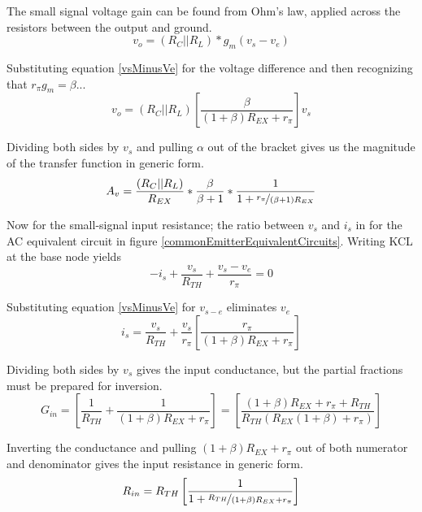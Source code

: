 \documentclass[titlepage, letterpaper, 11pt]{article}
\begin{document}
The small signal voltage gain can be found from Ohm's law, applied
across the resistors between the output and ground.
\begin{equation*}
v_{o}=(R_{C}||R_{L})*g_{m}(v_{s}-v_{e})
\end{equation*}

Substituting equation \ref{vsMinusVe} for the voltage difference and
then recognizing that $r_{\pi}g_{m}=\beta$...
\begin{equation*}
v_{o}=(R_{C}||R_{L})
\left[\frac{\beta}{(1+\beta)R_{EX}+r_{\pi}}\right]v_{s}
\end{equation*}

Dividing both sides by $v_{s}$ and pulling $\alpha$ out of the
bracket gives us the magnitude of the transfer function in generic
form.
\begin{equation}
A_{v}=\frac{(R_{C}||R_{L})}{R_{EX}}*\frac{\beta}{\beta+1}*
\frac{1}{1+\nicefrac{r_{\pi}}{(\beta+1)R_{EX}}}
\label{ceAv}
\end{equation}

Now for the small-signal input resistance; the ratio between
$v_{s}$ and $i_{s}$ in for the AC equivalent circuit in figure
\ref{commonEmitterEquivalentCircuits}. Writing KCL at the base node
yields
\begin{equation*}
-i_{s}+\frac{v_{s}}{R_{TH}}+\frac{v_{s}-v_{e}}{r_{\pi}}=0
\end{equation*}

Substituting equation \ref{vsMinusVe} for $v_{s-e}$ 
eliminates $v_{e}$
\begin{equation*}
i_{s}=\frac{v_{s}}{R_{TH}}+\frac{v_{s}}{r_{\pi}}
\left[\frac{r_{\pi}}{(1+\beta)R_{EX}+r_{\pi}}\right]
\end{equation*}

Dividing both sides by $v_{s}$ gives the input conductance,
but the partial fractions must be prepared for inversion.
\begin{equation*}
G_{in}=
\left[\frac{1}{R_{TH}}+\frac{1}{(1+\beta)R_{EX}+r_{\pi}}\right]=
\left[\frac{(1+\beta)R_{EX}+r_{\pi}+R_{TH}}
{R_{TH}(R_{EX}(1+\beta)+r_{\pi})}\right]
\end{equation*}

Inverting the conductance and pulling
$(1+\beta)R_{EX}+r_{\pi}$ out of both numerator and denominator gives
the input resistance in generic form.
\begin{equation*}
R_{in}=R_{TH}
\left[\frac{1}{1+\nicefrac{R_{TH}}{(1+\beta)R_{EX}+r_{\pi}}}\right]
\end{equation*}
\end{document}
